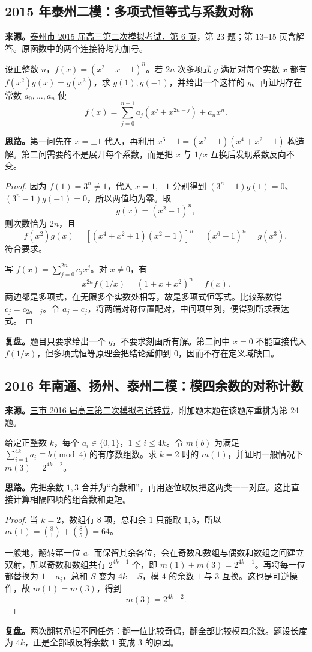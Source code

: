 \documentclass[UTF8,12pt,a4paper,fontset=fandol]{ctexart}
\begin{document}
\subsection{2015 年泰州二模：多项式恒等式与系数对称}\label{sec:c2015tz2}
\textbf{来源。}\href{https://www.51wendang.com/doc/ade6c3141d94fc4b359d414c/6}{泰州市 2015 届高三第二次模拟考试，第 6 页}，第 23 题；第 13--15 页含解答。原函数中的两个连接符均为加号。
\begin{example}[题意]
设正整数 $n$，$f(x)=(x^2+x+1)^n$。若 $2n$ 次多项式 $g$ 满足对每个实数 $x$ 都有 $f(x^2)g(x)=g(x^3)$，求 $g(1),g(-1)$，并给出一个这样的 $g$。再证明存在常数 $a_0,\ldots,a_n$ 使
\[
f(x)=\sum_{j=0}^{n-1}a_j(x^j+x^{2n-j})+a_nx^n.
\]
\end{example}
\textbf{思路。}第一问先在 $x=\pm1$ 代入，再利用 $x^6-1=(x^2-1)(x^4+x^2+1)$ 构造解。第二问需要的不是展开每个系数，而是把 $x$ 与 $1/x$ 互换后发现系数反向不变。
\begin{proof}
因为 $f(1)=3^n\ne1$，代入 $x=1,-1$ 分别得到 $(3^n-1)g(1)=0$、$(3^n-1)g(-1)=0$，所以两值均为零。取
\[
g(x)=(x^2-1)^n,
\]
则次数恰为 $2n$，且
\[
f(x^2)g(x)=[(x^4+x^2+1)(x^2-1)]^n
=(x^6-1)^n=g(x^3),
\]
符合要求。

写 $f(x)=\sum_{j=0}^{2n}c_jx^j$。对 $x\ne0$，有
\[
x^{2n}f(1/x)=(1+x+x^2)^n=f(x).
\]
两边都是多项式，在无限多个实数处相等，故是多项式恒等式。比较系数得 $c_j=c_{2n-j}$。令 $a_j=c_j$，将两端对称位置配对，中间项单列，便得到所求表达式。
\end{proof}
\textbf{复盘。}题目只要求给出一个 $g$，不要求刻画所有解。第二问中 $x=0$ 不能直接代入 $f(1/x)$，但多项式恒等原理会把结论延伸到 $0$，因而不存在定义域缺口。

\subsection{2016 年南通、扬州、泰州二模：模四余数的对称计数}\label{sec:c2016nty2}
\textbf{来源。}\href{https://www.renrendoc.com/paper/165058812.html}{三市 2016 届高三第二次模拟考试转载}，附加题末题在该题库重排为第 24 题。
\begin{example}[题意]
给定正整数 $k$，每个 $a_i\in\{0,1\}$，$1\leq i\leq4k$。令 $m(b)$ 为满足 $\sum_{i=1}^{4k}a_i\equiv b\pmod4$ 的有序数组数。求 $k=2$ 时的 $m(1)$，并证明一般情况下 $m(3)=2^{4k-2}$。
\end{example}
\textbf{思路。}先把余数 $1,3$ 合并为“奇数和”，再用逐位取反把这两类一一对应。这比直接计算相隔四项的组合数和更短。
\begin{proof}
当 $k=2$，数组有 $8$ 项，总和余 $1$ 只能取 $1,5$，所以 $m(1)=\binom81+\binom85=64$。

一般地，翻转第一位 $a_1$ 而保留其余各位，会在奇数和数组与偶数和数组之间建立双射，所以奇数和数组共有 $2^{4k-1}$ 个，即 $m(1)+m(3)=2^{4k-1}$。再将每一位都替换为 $1-a_i$，总和 $S$ 变为 $4k-S$，模 $4$ 的余数 $1$ 与 $3$ 互换。这也是可逆操作，故 $m(1)=m(3)$，得到
\[
\boxed{m(3)=2^{4k-2}}.
\]
\end{proof}
\textbf{复盘。}两次翻转承担不同任务：翻一位比较奇偶，翻全部比较模四余数。题设长度为 $4k$，正是全部取反将余数 $1$ 变成 $3$ 的原因。
\end{document}
